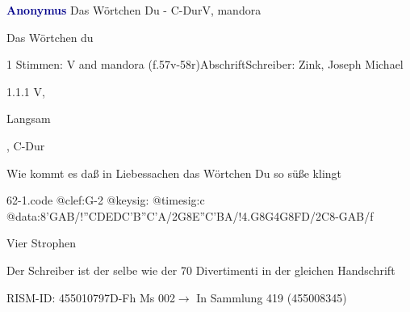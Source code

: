 \documentclass[twocolumn, 12pt]{book}
\begin{document}
\par \vspace{16pt} \textcolor{darkblue}{\textbf{Anonymus  }}\hfillplus{\textbf{[62]}}\newline Das Wörtchen Du - C-Dur\newline V, mandora
\par \begin{itshape}[heading, f.57v:] Das Wörtchen du\end{itshape} 
\par \textcolor{darkblue}{}  1 Stimmen: V and mandora  (f.57v-58r)\newline Abschrift\newline Schreiber: Zink, Joseph Michael
\par 1.1.1  V, \begin{itshape}Langsam\end{itshape}, C-Dur\newline \begin{footnotesize} Wie kommt es daß in Liebessachen das Wörtchen Du so süße klingt \end{footnotesize}  
\begin{filecontents*}{62-1.code}
@clef:G-2
@keysig:
@timesig:c
@data:8'GAB/!{''CD}{ED}{C'B}{''C'A}/2G8E''C'BA/!4.G8G4G8FD/2C8-GAB/f
\end{filecontents*}
\newline %
\par Vier Strophen
\par Der Schreiber ist der selbe wie der 70 Divertimenti in der gleichen Handschrift
\par RISM-ID: 455010797\newline D-Fh  Ms 002\newline $\rightarrow$ In Sammlung 419 (455008345)
      
\end{document}
